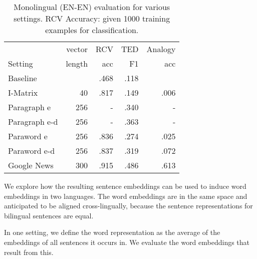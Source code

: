 \begin{table}\center
\setlength\tabcolsep{3pt}
\begin{tabular}{l |rr r r}
 			&vector	&RCV 			&TED		&Analogy\\
Setting		&length	&acc			&F1		&acc\\\hline
Baseline		&		&.468			&.118	 	&		\\
I-Matrix		&40		&.817			&.149		&.006\\
Paragraph e		&256		&- 			&.340		&-\\
Paragraph e-d 	&256		&- 			&.363		&-\\
Paraword e		&256		&.836			&.274		&.025	\\
Paraword e-d	&256		&.837			&.319		&.072\\
Google News		&300		&.915			&.486		&.613\\
\end{tabular}
\caption{Monolingual (EN-EN) evaluation for various settings.
RCV Accuracy: given 1000 training examples for classification.}
\end{table}


We explore how the resulting sentence embeddings can be used to induce word embeddings in two languages. The word embeddings are in the same space and anticipated to be aligned cross-lingually, because the sentence representations for bilingual sentences are equal.

In one setting, we define the word representation as the average of the embeddings of all sentences it occurs in. We evaluate the word embeddings that result from this.



